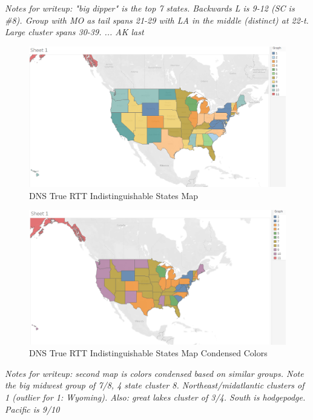 \textit{Notes for writeup: "big dipper" is the top 7 states. Backwards L is 9-12 (SC is \#8). Group with MO as tail spans 21-29 with LA in the middle (distinct) at 22-t. Large cluster spans 30-39. ... AK last}

\begin{figure}[H]
    \centering
    \includegraphics[width=\textwidth]{images/dns/kruskals_analysis_no_auth_agg/rtt/distinct_map1.png}
    \caption{DNS True RTT Indistinguishable States Map}
    \label{fig:dns_true_rtt_indistinguishable_states_map}
\end{figure}

\begin{figure}[H]
    \centering
    \includegraphics[width=\textwidth]{images/dns/kruskals_analysis_no_auth_agg/rtt/distinct_map2.png}
    \caption{DNS True RTT Indistinguishable States Map Condensed Colors}
    \label{fig:dns_true_rtt_indistinguishable_states_map_condensed_colors}
\end{figure}

\textit{Notes for writeup: second map is colors condensed based on similar groups. Note the big midwest group of 7/8, 4 state cluster 8. Northeast/midatlantic clusters of 1 (outlier for 1: Wyoming). Also: great lakes cluster of 3/4. South is hodgepodge. Pacific is 9/10}


